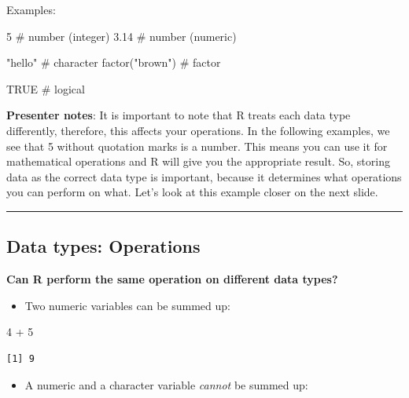 \documentclass[
  letterpaper,
  DIV=11,
  numbers=noendperiod]{scrartcl}
\newenvironment{Shaded}{\begin{snugshade}}{\end{snugshade}}
\newcommand{\CommentTok}[1]{\textcolor[rgb]{0.37,0.37,0.37}{#1}}
\newcommand{\ConstantTok}[1]{\textcolor[rgb]{0.56,0.35,0.01}{#1}}
\newcommand{\DecValTok}[1]{\textcolor[rgb]{0.68,0.00,0.00}{#1}}
\newcommand{\FloatTok}[1]{\textcolor[rgb]{0.68,0.00,0.00}{#1}}
\newcommand{\FunctionTok}[1]{\textcolor[rgb]{0.28,0.35,0.67}{#1}}
\newcommand{\NormalTok}[1]{\textcolor[rgb]{0.00,0.23,0.31}{#1}}
\newcommand{\SpecialCharTok}[1]{\textcolor[rgb]{0.37,0.37,0.37}{#1}}
\newcommand{\StringTok}[1]{\textcolor[rgb]{0.13,0.47,0.30}{#1}}
\providecommand{\tightlist}{%
  \setlength{\itemsep}{0pt}\setlength{\parskip}{0pt}}
\begin{document}
\begin{Shaded}
\begin{Highlighting}[]
\NormalTok{Examples}\SpecialCharTok{:}
  
\DecValTok{5}        \CommentTok{\# number (integer)}
\FloatTok{3.14}     \CommentTok{\# number (numeric)}

\StringTok{"hello"}  \CommentTok{\# character}
\FunctionTok{factor}\NormalTok{(}\StringTok{"brown"}\NormalTok{)  }\CommentTok{\# factor}

\ConstantTok{TRUE}     \CommentTok{\# logical}
\end{Highlighting}
\end{Shaded}

\textbf{Presenter notes}: It is important to note that R treats each
data type differently, therefore, this affects your operations. In the
following examples, we see that 5 without quotation marks is a number.
This means you can use it for mathematical operations and R will give
you the appropriate result. So, storing data as the correct data type is
important, because it determines what operations you can perform on
what. Let's look at this example closer on the next slide.

\begin{center}\rule{0.5\linewidth}{0.5pt}\end{center}

\subsection{Data types: Operations}\label{data-types-operations}

\textbf{Can R perform the same operation on different data types?}

\begin{itemize}
\tightlist
\item
  Two numeric variables can be summed up:
\end{itemize}

\begin{Shaded}
\begin{Highlighting}[]
\DecValTok{4} \SpecialCharTok{+} \DecValTok{5}
\end{Highlighting}
\end{Shaded}

\begin{verbatim}
[1] 9
\end{verbatim}

\begin{itemize}
\tightlist
\item
  A numeric and a character variable \emph{cannot} be summed up:
\end{itemize}
\end{document}
